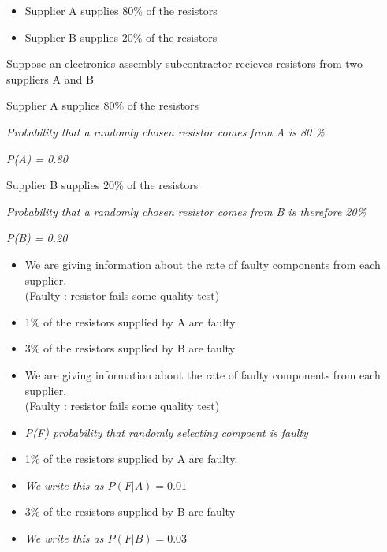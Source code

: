 \documentclass[12pt]{report}
\begin{document}
		\begin{itemize}
			\item Supplier A supplies 80\% of the resistors
			\vspace{2cm}
			\item Supplier B supplies 20\% of the resistors
			\vspace{2cm}
		\end{itemize}
		
		
		\Large
		Suppose an electronics assembly subcontractor recieves resistors from two suppliers A and B
		
		\begin{itemize}
			\item Supplier A supplies 80\% of the resistors
			{
				\Large
				
				\item \textit{Probability that a randomly chosen resistor comes from A is 80 \%}
				\item \textit{P(A) = 0.80 }
				
			}
			\item Supplier B supplies 20\% of the resistors
			\item \textit{Probability that a randomly chosen resistor comes from B is therefore 20\%}
			\item \textit{P(B) = 0.20}
		\end{itemize}
		
		\Large
		\begin{itemize}
			\item We are giving information about the rate of faulty components from each supplier. \\(Faulty : resistor fails some quality test)
			\vspace{1cm}
			\item 1\% of the resistors supplied by A are faulty
			\vspace{1cm}
			\item 3\% of the resistors supplied by B are faulty 
			\vspace{1cm}
		\end{itemize}
		
		\Large
		\begin{itemize}
			\item We are giving information about the rate of faulty components from each supplier. \\(Faulty : resistor fails some quality test)
			\item  \textit{P(F) probability that randomly selecting compoent is faulty}
			\item 1\% of the resistors supplied by A are faulty.
			\item\textit{ We write this as $P(F|A) =0.01$}
			\item 3\% of the resistors supplied by B are faulty 
			\item \textit{We write this as $P(F|B) =0.03$}
		\end{itemize}
		
\end{document}
